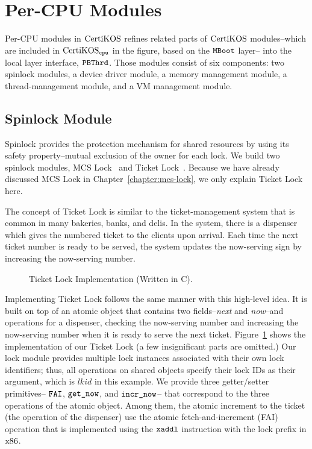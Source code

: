 \section{Per-CPU Modules}
\label{chapter:certikos:sec:per-cpu-modules}

Per-CPU modules in $\mathrm{CertiKOS}$  refines related parts of  $\mathrm{CertiKOS}$ modules--which are included in $\mathrm{CertiKOS}_{{\mathrm{\texttt{cpu}}}}$ in the figure, based on the ${\mathrm{\texttt{MBoot}}}$ layer-- 
into the  local layer interface, ${{\mathrm{\texttt{PBThrd}}}}$.
Those modules consist of six components:
two spinlock modules, a device driver module, a memory management module,  a thread-management module, and a VM management module. 

\subsection{Spinlock Module}
\label{chapter:certikos:subsec:spinlock-module}

Spinlock provides the protection mechanism for shared resources by using its safety property--mutual exclusion of the owner for each lock. 
We build two spinlock modules, 
MCS Lock~\cite{mcs91} and Ticket Lock~\cite{lwn:ticketlocks}.
Because we have already discussed MCS Lock in Chapter~\ref{chapter:mcs-lock}, 
we only explain Ticket Lock here.

The concept of Ticket Lock is similar to the ticket-management system that is common in many bakeries, banks, and delis. 
In the system, 
there is a dispenser which gives the numbered ticket to the clients upon arrival. 
Each time the next ticket number is ready to 
be served, 
the system updates the now-serving sign by increasing the now-serving number. 
\begin{figure}
 
\caption{Ticket Lock Implementation (Written in C).}
\label{fig:chapter:certikos:ticket-lock-example}
\end{figure}
Implementing Ticket Lock  follows the same manner with this high-level idea.
It is built on top of an atomic object that contains two fields--\textit{next} and \textit{now}--and operations for a dispenser, checking the now-serving number and increasing the now-serving number when
it is ready to serve the next ticket. 
Figure~\ref{fig:chapter:certikos:ticket-lock-example} shows the implementation of our Ticket Lock (a few insignificant parts are omitted.)
Our lock module provides multiple lock instances associated with their own lock identifiers;
thus, all operations on shared objects specify their lock IDs as their argument, which is $lkid$ in this example.
We provide three getter/setter primitives-- ${\mathrm{\texttt{FAI}}}$, ${\mathrm{\texttt{get\_now}}}$, and ${\mathrm{\texttt{incr\_now}}}$--
that correspond to the three operations of the atomic object.
Among them, the atomic increment to the ticket (the operation of the dispenser) 
use the atomic fetch-and-increment (FAI) operation that is implemented using the ${\mathrm{\texttt{xaddl}}}$ instruction with the 
lock prefix in $\mathrm{x86}$.

